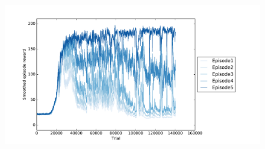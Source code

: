 \begin{figure}
{		\includegraphics[width=0.49\linewidth]{fig/res_perms5ep_94.pdf}}
	\\
	\caption{}
	\label{fig:varied_gamma}
\end{figure}


